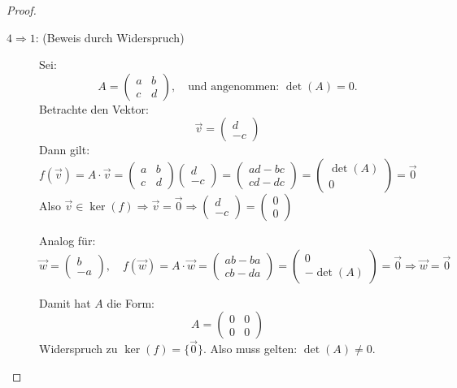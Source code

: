 \begin{proof}
\begin{description}
  \item[\(4 \Rightarrow 1\): (Beweis durch Widerspruch)]
  Sei:
  \[
  A = \begin{pmatrix} a & b \\ c & d \end{pmatrix}, \quad \text{und angenommen: } \det(A) = 0.
  \]
  Betrachte den Vektor:
  \[
  \vec{v} = \begin{pmatrix} d \\ -c \end{pmatrix}
  \]
  Dann gilt:
  \[
  f(\vec{v}) = A \cdot \vec{v} = 
  \begin{pmatrix} a & b \\ c & d \end{pmatrix}
  \begin{pmatrix} d \\ -c \end{pmatrix}
  = \begin{pmatrix} ad - bc \\ cd - dc \end{pmatrix}
  = \begin{pmatrix} \det(A) \\ 0 \end{pmatrix}
  = \vec{0}
  \]
  Also \( \vec{v} \in \ker(f) \Rightarrow \vec{v} = \vec{0} \Rightarrow \begin{pmatrix} d \\ -c \end{pmatrix} = \begin{pmatrix} 0 \\ 0 \end{pmatrix} \)

  Analog für:
  \[
  \vec{w} = \begin{pmatrix} b \\ -a \end{pmatrix}, \quad
  f(\vec{w}) = A \cdot \vec{w} = \begin{pmatrix} ab - ba \\ cb - da \end{pmatrix}
  = \begin{pmatrix} 0 \\ -\det(A) \end{pmatrix}
  = \vec{0}
  \Rightarrow \vec{w} = \vec{0}
  \]

  Damit hat \( A \) die Form:
  \[
  A = \begin{pmatrix} 0 & 0 \\ 0 & 0 \end{pmatrix}
  \]
  Widerspruch zu \( \ker(f) = \{ \vec{0} \} \).  
  Also muss gelten: \( \det(A) \neq 0 \).
\end{description}

\end{proof}

